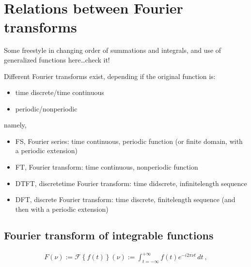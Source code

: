 \documentclass[letterpaper,10pt,english]{jupyterBook}
\begin{document}
\section{Relations between Fourier transforms}
\label{\detokenize{ch/complex/fourier-transforms:relations-between-fourier-transforms}}\label{\detokenize{ch/complex/fourier-transforms:complex-fourier-transforms}}\label{\detokenize{ch/complex/fourier-transforms::doc}}
\sphinxAtStartPar
Some freestyle in changing order of summations and integrals, and use of generalized functions here…check it!

\sphinxAtStartPar
Different Fourier transforms exist, depending if the original function is:
\begin{itemize}
\item {} 
\sphinxAtStartPar
time discrete/time continuous

\item {} 
\sphinxAtStartPar
periodic/non\sphinxhyphen{}periodic

\end{itemize}

\sphinxAtStartPar
namely,
\begin{itemize}
\item {} 
\sphinxAtStartPar
FS, Fourier series: time continuous, periodic function (or finite domain, with a periodic extension)

\item {} 
\sphinxAtStartPar
FT, Fourier transform: time continuous, non\sphinxhyphen{}periodic function

\item {} 
\sphinxAtStartPar
DTFT, discrete\sphinxhyphen{}time Fourier transform: time didscrete, infinite\sphinxhyphen{}length sequence

\item {} 
\sphinxAtStartPar
DFT, discrete Fourier transform: time discrete, finite\sphinxhyphen{}length sequence (and then with a periodic extension)

\end{itemize}


\subsection{Fourier transform of integrable functions}
\label{\detokenize{ch/complex/fourier-transforms:fourier-transform-of-integrable-functions}}\label{\detokenize{ch/complex/fourier-transforms:complex-fourier-transform}}\begin{equation*}
\begin{split}F(\nu) := \mathscr{F}\left\{f(t)\right\}(\nu) := \int_{t=-\infty}^{+\infty} f(t) e^{-i 2 \pi \nu t} \, dt \ ,\end{split}
\end{equation*}
\end{document}
